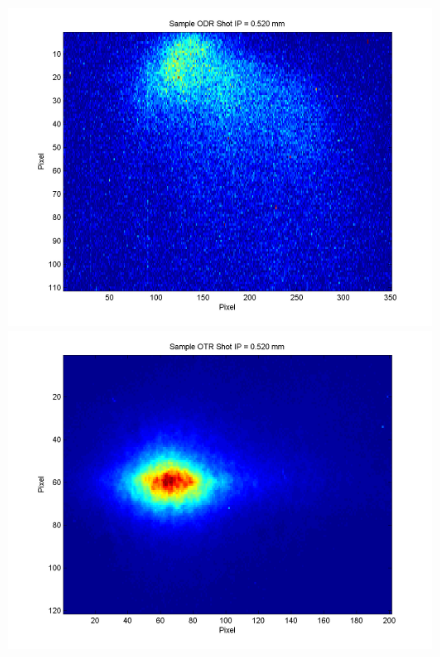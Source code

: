 \documentclass[12pt]{article}
\begin{document}
\begin{figure}
\begin{center}
\includegraphics[scale=0.5]{Figures/Sample_ODR_520.PNG}
\includegraphics[scale=0.5]{Figures/Sample_OTR_520.PNG}
\caption{}
\end{center}
\end{figure}
\end{document}
